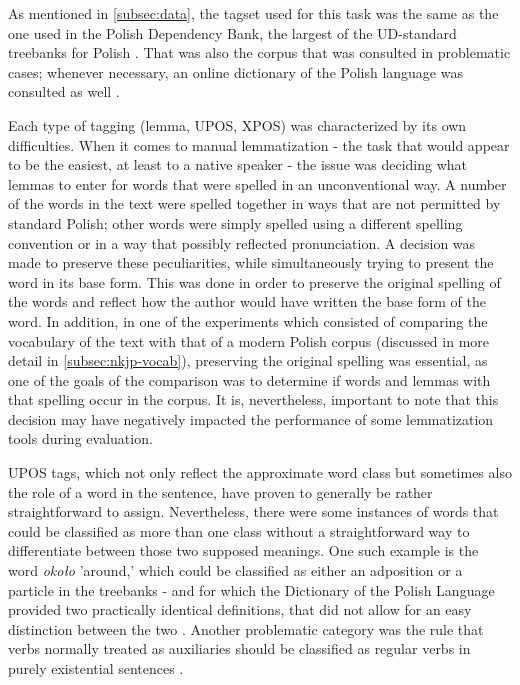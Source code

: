 As mentioned in \autoref{subsec:data}, the tagset used for this task was the same as the one used in the Polish Dependency Bank, the largest of the UD-standard treebanks for Polish \citep{wroblewska-2018-extended}. That was also the corpus that was consulted in problematic cases; whenever necessary, an online dictionary of the Polish language was consulted as well \citep{pwn_n.d.}.

Each type of tagging (lemma, UPOS, XPOS) was characterized by its own difficulties. When it comes to manual lemmatization - the task that would appear to be the easiest, at least to a native speaker - the issue was deciding what lemmas to enter for words that were spelled in an unconventional way. A number of the words in the text were spelled together in ways that are not permitted by standard Polish; other words were simply spelled using a different spelling convention or in a way that possibly reflected pronunciation. A decision was made to preserve these peculiarities, while simultaneously trying to present the word in its base form. This was done in order to preserve the original spelling of the words and reflect how the author would have written the base form of the word. In addition, in one of the experiments which consisted of comparing the vocabulary of the text with that of a modern Polish corpus (discussed in more detail in \autoref{subsec:nkjp-vocab}), preserving the original spelling was essential, as one of the goals of the comparison was to determine if words and lemmas with that spelling occur in the corpus. It is, nevertheless, important to note that this decision may have negatively impacted the performance of some lemmatization tools during evaluation. 

UPOS tags, which not only reflect the approximate word class but sometimes also the role of a word in the sentence, have proven to generally be rather straightforward to assign. Nevertheless, there were some instances of words that could be classified as more than one class without a straightforward way to differentiate between those two supposed meanings. One such example is the word \textit{około} 'around,' which could be classified as either an adposition or a particle in the treebanks - and for which the Dictionary of the Polish Language provided two practically identical definitions, that did not allow for an easy distinction between the two \citep{okolopwn}. Another problematic category was the rule that verbs normally treated as auxiliaries should be classified as regular verbs in purely existential sentences \citep{polishud}. 

